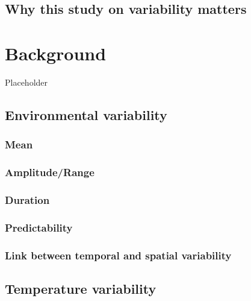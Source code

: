 \documentclass[12pt,twoside]{reedthesis}
\begin{document}
\hypertarget{why-this-study-on-variability-matters}{%
\section{Why this study on variability matters}\label{why-this-study-on-variability-matters}}

\hypertarget{background}{%
\chapter{Background}\label{background}}

Placeholder

\hypertarget{environmental-variability}{%
\section{Environmental variability}\label{environmental-variability}}

\hypertarget{mean}{%
\subsection{Mean}\label{mean}}

\hypertarget{amplituderange}{%
\subsection{Amplitude/Range}\label{amplituderange}}

\hypertarget{duration}{%
\subsection{Duration}\label{duration}}

\hypertarget{predictability}{%
\subsection{Predictability}\label{predictability}}

\hypertarget{link-between-temporal-and-spatial-variability}{%
\subsection{Link between temporal and spatial variability}\label{link-between-temporal-and-spatial-variability}}

\hypertarget{temperature-variability}{%
\section{Temperature variability}\label{temperature-variability}}
\end{document}
